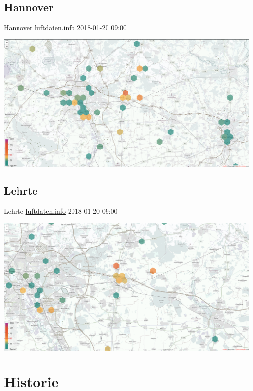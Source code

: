 \documentclass[aspectratio=169]{beamer} %
\begin{document}
\subsection{Hannover}
\begin{frame}{Hannover \href{http://hannover.maps.luftdaten.info/\#10/52.373/10.005}{luftdaten.info} 2018-01-20 09:00}
  \begin{center}
    \includegraphics[width=\textwidth]{../screenshots/luftdaten-zoom-b.png}
  \end{center}
\end{frame}
\subsection{Lehrte}
\begin{frame}{Lehrte \href{http://hannover.maps.luftdaten.info/\#12/52.373/10.005}{luftdaten.info} 2018-01-20 09:00}
  \begin{center}
    \includegraphics[width=\textwidth]{../screenshots/luftdaten-zoom-a.png}
  \end{center}
\end{frame}

\section{Historie}
\end{document}
